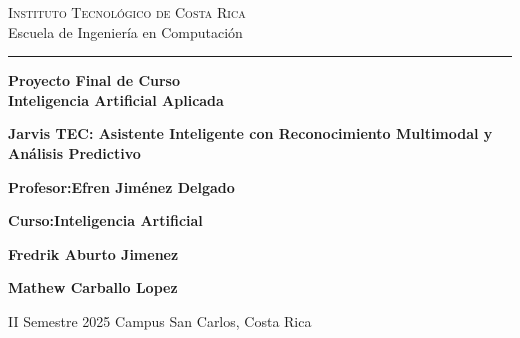 
\begin{titlepage}

\begin{center}
{\scshape \Large
Instituto Tecnológico de Costa Rica\\
}
\vspace{4mm}
{\Large
Escuela de Ingeniería en Computación
}
\vspace{8mm}
\hrule
\vspace{4mm}
\begin{spacing}{1.8}
{\large\textbf{
Proyecto Final de Curso\\
Inteligencia Artificial Aplicada
}}
\end{spacing}
\vspace{42mm}

\begin{spacing}{2.0}
{\Large \bf Jarvis TEC: Asistente Inteligente con Reconocimiento Multimodal y Análisis Predictivo}\\
\end{spacing}
\end{center}

\vfill
\noindent
\begin{minipage}[t]{0.5\textwidth}
\large
\textbf{Profesor:Efren Jiménez Delgado}

 \vspace{5mm}
\textbf{Curso:Inteligencia Artificial}
\end{minipage}
\hfill
\begin{minipage}[t]{0.5\textwidth}\raggedleft
\large
\textbf{Fredrik  Aburto Jimenez}

\textbf{Mathew Carballo Lopez}

\end{minipage}

\vspace{24mm}

\begin{center}
\large II Semestre 2025
Campus San Carlos, Costa Rica
\end{center}

\end{titlepage}
\restoregeometry